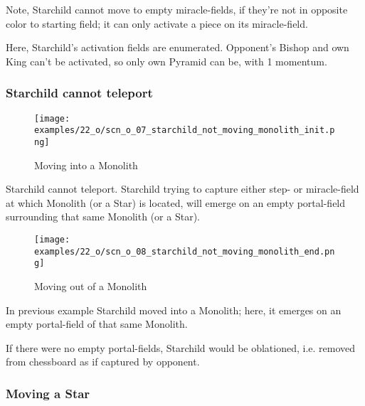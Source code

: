 Note, Starchild cannot move to empty miracle-fields, if they're not in opposite
color to starting field; it can only activate a piece on its miracle-field.

Here, Starchild's activation fields are enumerated. Opponent's Bishop and own King
can't be activated, so only own Pyramid can be, with 1 momentum.

\clearpage %

\subsubsection*{Starchild cannot teleport}
\label{sec:One/Starchild/Movement/Starchild cannot teleport}

\noindent
\begin{wrapfigure}[6]{l}{0.4\textwidth}
\centering
\texttt{[image: examples/22\_o/scn\_o\_07\_starchild\_not\_moving\_monolith\_init.png]}
\caption{Moving into a Monolith}
\label{fig:scn_o_07_starchild_not_moving_monolith_init}
\end{wrapfigure}
Starchild cannot teleport. Starchild trying to capture either step- or miracle-field
at which Monolith (or a Star) is located, will emerge on an empty portal-field
surrounding that same Monolith (or a Star).

\vspace*{5.1\baselineskip}
\noindent
\begin{wrapfigure}[8]{l}{0.4\textwidth}
\centering
\texttt{[image: examples/22\_o/scn\_o\_08\_starchild\_not\_moving\_monolith\_end.png]}
\caption{Moving out of a Monolith}
\label{fig:scn_o_08_starchild_not_moving_monolith_end}
\end{wrapfigure}
In previous example Starchild moved into a Monolith; here, it emerges on an empty
portal-field of that same Monolith.

If there were no empty portal-fields, Starchild would be oblationed, i.e. removed
from chessboard as if captured by opponent.

\clearpage %

\subsubsection*{Moving a Star}
\label{sec:One/Starchild/Movement/Moving a Star}

